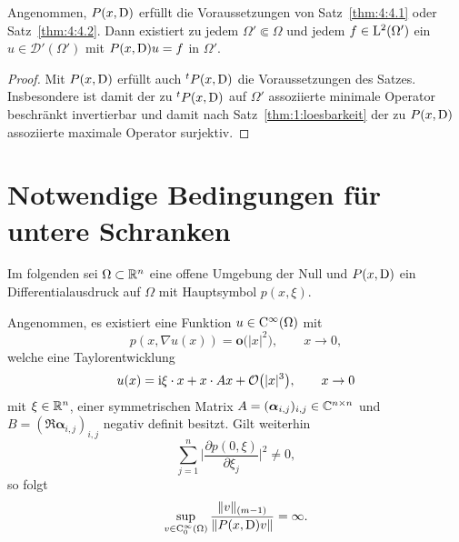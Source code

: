 \begin{cor}
Angenommen, $P(x,\mathrm D)$ erfüllt die Voraussetzungen von Satz~\ref{thm:4:4.1} oder Satz~\ref{thm:4:4.2}. Dann existiert zu jedem $\Omega'\Subset\Omega$ und jedem
$f\in\mathrm L^2(\Omega')$ ein $u\in\mathscr D'(\Omega')$ mit $P(x,\mathrm D)u=f$ in $\Omega'$.
\end{cor}
\begin{proof}
Mit $P(x,\mathrm D)$ erfüllt auch ${}^tP(x,\mathrm D)$ die Voraussetzungen des Satzes. Insbesondere ist damit der zu ${}^tP(x,\mathrm D)$ auf $\Omega'$ assoziierte minimale Operator beschränkt invertierbar und damit nach Satz~\ref{thm:1:loesbarkeit} der zu $P(x,\mathrm D)$ assoziierte maximale Operator surjektiv.
\end{proof}

\section{Notwendige Bedingungen für untere Schranken}
Im folgenden sei $\Omega \subset \mathbb R^n$ eine offene Umgebung der Null und $P(x,\mathrm D)$ ein Differentialausdruck auf $\Omega$ mit Hauptsymbol $p(x,\xi)$. 
\begin{lem}\label{lem1}
Angenommen, es existiert eine Funktion $u \in \mathrm C^\infty (\Omega)$ mit 
\begin{equation}
\label{grad}
p(x, \nabla u(x)) = \mathbf{o} \big(|x|^2\big), \qquad  x \rightarrow 0,
\end{equation}
welche eine Taylorentwicklung 
\begin{equation}\label{taylor}
u(x) = \mathrm i \xi\cdot x + x\cdot A x + \mathcal O\big(|x|^3\big),\qquad x\to0
\end{equation}
mit $\xi\in\mathbb R^n$, einer symmetrischen Matrix $A=(\boldsymbol\alpha_{i,j})_{i,j}\in\mathbb C^{n\times n}$ und $B = (\Re \boldsymbol\alpha_{i,j})_{i,j} $ negativ definit  besitzt. 
Gilt weiterhin  
\begin{equation}
\label{normpart}
\sum_{j=1}^{n}\bigg|\frac{\partial p(0,\xi)}{\partial \xi_j}\bigg|^2 \neq 0,
\end{equation}
so folgt
\begin{equation}
\label{lm 1 eq}
\sup_{v\in\mathrm C_0^\infty(\Omega)} \frac{ \lVert v \rVert_{(m-1)} }{ \lVert P(x,\mathrm D)v \rVert} = \infty.
\end{equation}
\end{lem}
